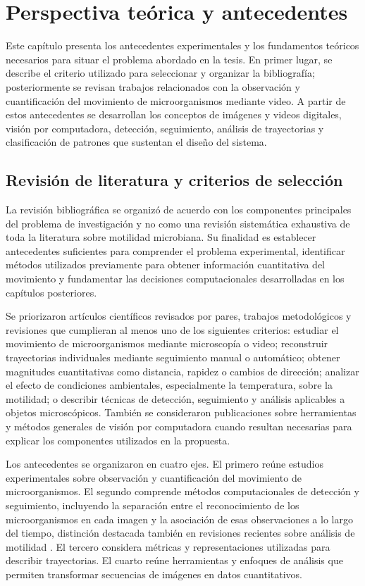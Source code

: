 \chapter{Perspectiva teórica y antecedentes}

Este capítulo presenta los antecedentes experimentales y los fundamentos teóricos necesarios para situar el problema abordado en la tesis. En primer lugar, se describe el criterio utilizado para seleccionar y organizar la bibliografía; posteriormente se revisan trabajos relacionados con la observación y cuantificación del movimiento de microorganismos mediante video. A partir de estos antecedentes se desarrollan los conceptos de imágenes y videos digitales, visión por computadora, detección, seguimiento, análisis de trayectorias y clasificación de patrones que sustentan el diseño del sistema.

\section{Revisión de literatura y criterios de selección}

La revisión bibliográfica se organizó de acuerdo con los componentes principales del problema de investigación y no como una revisión sistemática exhaustiva de toda la literatura sobre motilidad microbiana. Su finalidad es establecer antecedentes suficientes para comprender el problema experimental, identificar métodos utilizados previamente para obtener información cuantitativa del movimiento y fundamentar las decisiones computacionales desarrolladas en los capítulos posteriores.

Se priorizaron artículos científicos revisados por pares, trabajos metodológicos y revisiones que cumplieran al menos uno de los siguientes criterios: estudiar el movimiento de microorganismos mediante microscopía o video; reconstruir trayectorias individuales mediante seguimiento manual o automático; obtener magnitudes cuantitativas como distancia, rapidez o cambios de dirección; analizar el efecto de condiciones ambientales, especialmente la temperatura, sobre la motilidad; o describir técnicas de detección, seguimiento y análisis aplicables a objetos microscópicos. También se consideraron publicaciones sobre herramientas y métodos generales de visión por computadora cuando resultan necesarias para explicar los componentes utilizados en la propuesta.

Los antecedentes se organizaron en cuatro ejes. El primero reúne estudios experimentales sobre observación y cuantificación del movimiento de microorganismos. El segundo comprende métodos computacionales de detección y seguimiento, incluyendo la separación entre el reconocimiento de los microorganismos en cada imagen y la asociación de esas observaciones a lo largo del tiempo, distinción destacada también en revisiones recientes sobre análisis de motilidad \cite{dubay2023}. El tercero considera métricas y representaciones utilizadas para describir trayectorias. El cuarto reúne herramientas y enfoques de análisis que permiten transformar secuencias de imágenes en datos cuantitativos.

